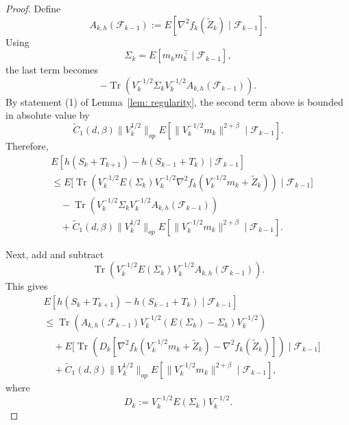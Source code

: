 \documentclass[11pt]{article}
\begin{document}
\begin{proof}
Define
\[
    A_{k,h}(\mathcal F_{k-1})
    :=
    E\left[
    \nabla^2 f_k(\widetilde Z_k)
    \mid
    \mathcal F_{k-1}
    \right].
\]
Using
\[
    \Sigma_k=E[m_km_k^\top\mid\mathcal F_{k-1}],
\]
the last term becomes
\[
    -
    \operatorname{Tr}\left(
    V_k^{-1/2}\Sigma_k V_k^{-1/2}
    A_{k,h}(\mathcal F_{k-1})
    \right).
\]
By statement (1) of Lemma~\ref{lem: regularity}, the second term above is
bounded in absolute value by
\[
\tilde C_1(d,\beta)\|V_k^{1/2}\|_{op}
E\left[
\|V_k^{-1/2}m_k\|^{2+\beta}
\mid
\mathcal F_{k-1}
\right].
\]
Therefore,
\begin{align*}
& E\left[
h(S_k+T_{k+1})-h(S_{k-1}+T_k)
\mid
\mathcal F_{k-1}
\right]
\\
&\le
E\biggl[
\operatorname{Tr}\left(
V_k^{-1/2}E(\Sigma_k)V_k^{-1/2}
\nabla^2 f_k\left(V_k^{-1/2}m_k+\widetilde Z_k\right)
\right)
\mid
\mathcal F_{k-1}
\biggr]
\\
&\quad
-
\operatorname{Tr}\left(
V_k^{-1/2}\Sigma_k V_k^{-1/2}
A_{k,h}(\mathcal F_{k-1})
\right)
\\
&\quad
+
\tilde C_1(d,\beta)\|V_k^{1/2}\|_{op}
E\left[
\|V_k^{-1/2}m_k\|^{2+\beta}
\mid
\mathcal F_{k-1}
\right].
\end{align*}

Next, add and subtract
\[
\operatorname{Tr}\left(
V_k^{-1/2}E(\Sigma_k)V_k^{-1/2}
A_{k,h}(\mathcal F_{k-1})
\right).
\]
This gives
\begin{align*}
& E\left[
h(S_k+T_{k+1})-h(S_{k-1}+T_k)
\mid
\mathcal F_{k-1}
\right]
\\
&\le
\operatorname{Tr}\left(
A_{k,h}(\mathcal F_{k-1})
V_k^{-1/2}
\left(E(\Sigma_k)-\Sigma_k\right)
V_k^{-1/2}
\right)
\\
&\quad
+
E\biggl[
\operatorname{Tr}\left(
D_k
\left[
\nabla^2 f_k\left(V_k^{-1/2}m_k+\widetilde Z_k\right)
-
\nabla^2 f_k(\widetilde Z_k)
\right]
\right)
\mid
\mathcal F_{k-1}
\biggr]
\\
&\quad
+
\tilde C_1(d,\beta)\|V_k^{1/2}\|_{op}
E\left[
\|V_k^{-1/2}m_k\|^{2+\beta}
\mid
\mathcal F_{k-1}
\right],
\end{align*}
where
\[
    D_k:=V_k^{-1/2}E(\Sigma_k)V_k^{-1/2}.
\]


\end{proof}
\end{document}
